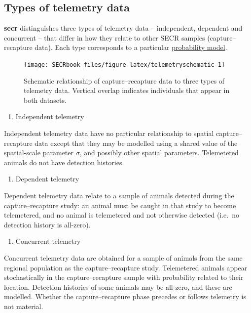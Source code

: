 \documentclass[
]{book}
\providecommand{\tightlist}{%
  \setlength{\itemsep}{0pt}\setlength{\parskip}{0pt}}
\begin{document}
\subsection{Types of telemetry data}\label{types-of-telemetry-data}

\textbf{secr} distinguishes three types of telemetry data -- independent, dependent and concurrent -- that differ in how they relate to other SECR samples (capture--recapture data). Each type corresponds to a particular \hyperref[telemetrylikelihood]{probability model}.

\begin{figure}
\texttt{[image: SECRbook\_files/figure-latex/telemetryschematic-1]} \caption{Schematic relationship of capture--recapture data to three types of telemetry data. Vertical overlap indicates individuals that appear in both datasets.}\label{fig:telemetryschematic}
\end{figure}

\begin{enumerate}
\def\labelenumi{\arabic{enumi}.}
\tightlist
\item
  Independent telemetry
\end{enumerate}

Independent telemetry data have no particular relationship to spatial capture--recapture data except that they may be modelled using a shared value of the spatial-scale parameter \(\sigma\), and possibly other spatial parameters. Telemetered animals do not have detection histories.

\begin{enumerate}
\def\labelenumi{\arabic{enumi}.}
\setcounter{enumi}{1}
\tightlist
\item
  Dependent telemetry
\end{enumerate}

Dependent telemetry data relate to a sample of animals detected during the capture--recapture study: an animal must be caught in that study to become telemetered, and no animal is telemetered and not otherwise detected (i.e.~no detection history is all-zero).

\begin{enumerate}
\def\labelenumi{\arabic{enumi}.}
\setcounter{enumi}{2}
\tightlist
\item
  Concurrent telemetry
\end{enumerate}

Concurrent telemetry data are obtained for a sample of animals from the same regional population as the capture--recapture study. Telemetered animals appear stochastically in the capture--recapture sample with probability related to their location. Detection histories of some animals may be all-zero, and these are modelled. Whether the capture--recapture phase precedes or follows telemetry is not material.
\end{document}
